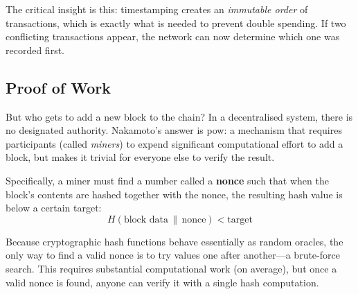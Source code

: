 The critical insight is this: timestamping creates an \emph{immutable order} of transactions, which is exactly what is needed to prevent double spending. If two conflicting transactions appear, the network can now determine which one was recorded first.

\subsection{Proof of Work}
\label{sec:pow-detail}

But who gets to add a new block to the chain? In a decentralised system, there is no designated authority. Nakamoto's answer is \gls{pow}: a mechanism that requires participants (called \emph{miners}) to expend significant computational effort to add a block, but makes it trivial for everyone else to verify the result.

Specifically, a miner must find a number called a \textbf{nonce} such that when the block's contents are hashed together with the nonce, the resulting hash value is below a certain target:
\begin{equation}
    H(\text{block data} \,\|\, \text{nonce}) < \text{target}
    \label{eq:pow}
\end{equation}

Because cryptographic hash functions behave essentially as random oracles, the only way to find a valid nonce is to try values one after another---a brute-force search. This requires substantial computational work (on average), but once a valid nonce is found, anyone can verify it with a single hash computation.

